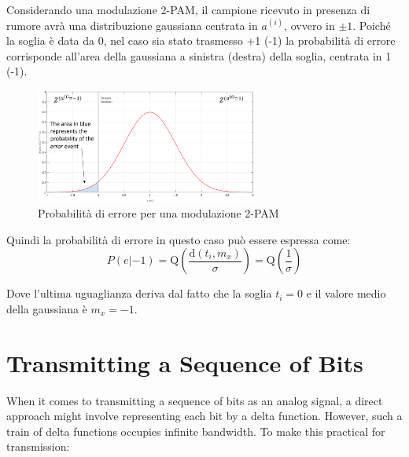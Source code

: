 Considerando una modulazione 2-PAM, il campione ricevuto in presenza di rumore avrà una distribuzione gaussiana centrata in $a^{(i)}$, ovvero in $\pm 1$. Poiché la soglia è data da 0, nel caso sia stato trasmesso +1 (-1) la probabilità di errore corrisponde all'area della gaussiana a sinistra (destra) della soglia, centrata in 1 (-1).

\begin{figure}[ht]
    \centering
    \includegraphics[width=0.65\textwidth]{imgs/2pamerror.jpg}
    \caption*{Probabilità di errore per una modulazione 2-PAM}
\end{figure}


Quindi la probabilità di errore in questo caso può essere espressa come:
\[
    P(e | -1) = \text{Q}(\frac{\text{d}(t_i, m_x)}{\sigma}) = \text{Q}(\frac{1}{\sigma})
\]

Dove l'ultima uguaglianza deriva dal fatto che la soglia $t_i=0$ e il valore medio della gaussiana è $m_x = -1$.

























\section*{Transmitting a Sequence of Bits}

When it comes to transmitting a sequence of bits as an analog signal, a direct approach might involve representing each bit by a delta function. However, such a train of delta functions occupies infinite bandwidth. To make this practical for transmission:


